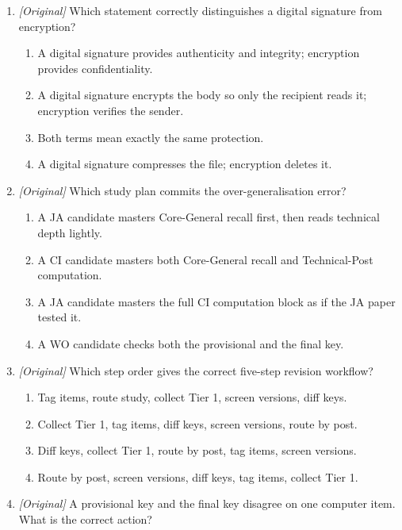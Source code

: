 \documentclass[11pt]{article}
\begin{document}
\begin{enumerate}[label=\textbf{Q\arabic*.}, leftmargin=*]
\begin{enumerate}[label=\Alph*.]
    \item 256-bit
  \end{enumerate}
\item \textit{[Original]} Which statement correctly distinguishes a digital signature from encryption?
  \begin{enumerate}[label=\Alph*.]
    \item A digital signature provides authenticity and integrity; encryption provides confidentiality.
    \item A digital signature encrypts the body so only the recipient reads it; encryption verifies the sender.
    \item Both terms mean exactly the same protection.
    \item A digital signature compresses the file; encryption deletes it.
  \end{enumerate}
\item \textit{[Original]} Which study plan commits the over-generalisation error?
  \begin{enumerate}[label=\Alph*.]
    \item A JA candidate masters Core-General recall first, then reads technical depth lightly.
    \item A CI candidate masters both Core-General recall and Technical-Post computation.
    \item A JA candidate masters the full CI computation block as if the JA paper tested it.
    \item A WO candidate checks both the provisional and the final key.
  \end{enumerate}
\item \textit{[Original]} Which step order gives the correct five-step revision workflow?
  \begin{enumerate}[label=\Alph*.]
    \item Tag items, route study, collect Tier 1, screen versions, diff keys.
    \item Collect Tier 1, tag items, diff keys, screen versions, route by post.
    \item Diff keys, collect Tier 1, route by post, tag items, screen versions.
    \item Route by post, screen versions, diff keys, tag items, collect Tier 1.
  \end{enumerate}
\item \textit{[Original]} A provisional key and the final key disagree on one computer item. What is the correct action?
  \begin{enumerate}[label=\Alph*.]

\end{enumerate}
\end{enumerate}
\end{document}
